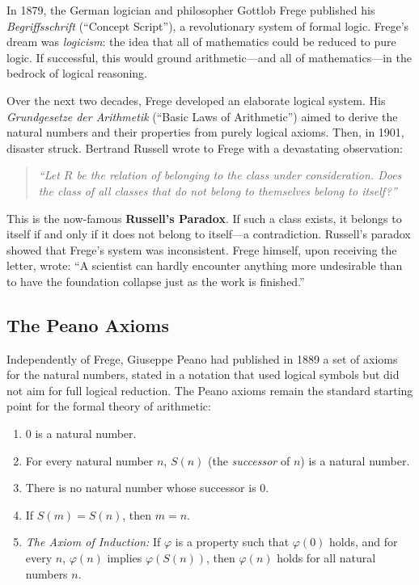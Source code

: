 In 1879, the German logician and philosopher Gottlob Frege published his \emph{Begriffsschrift} (``Concept Script''), a revolutionary system of formal logic. Frege's dream was \emph{logicism}: the idea that all of mathematics could be reduced to pure logic. If successful, this would ground arithmetic---and all of mathematics---in the bedrock of logical reasoning.

Over the next two decades, Frege developed an elaborate logical system. His \emph{Grundgesetze der Arithmetik} (``Basic Laws of Arithmetic'') aimed to derive the natural numbers and their properties from purely logical axioms. Then, in 1901, disaster struck. Bertrand Russell wrote to Frege with a devastating observation:

\begin{quote}
\textit{``Let $R$ be the relation of belonging to the class under consideration. Does the class of all classes that do not belong to themselves belong to itself?''}
\end{quote}

This is the now-famous \textbf{Russell's Paradox}. If such a class exists, it belongs to itself if and only if it does not belong to itself---a contradiction. Russell's paradox showed that Frege's system was inconsistent. Frege himself, upon receiving the letter, wrote: ``A scientist can hardly encounter anything more undesirable than to have the foundation collapse just as the work is finished.''

\subsection{The Peano Axioms}

Independently of Frege, Giuseppe Peano had published in 1889 a set of axioms for the natural numbers, stated in a notation that used logical symbols but did not aim for full logical reduction. The Peano axioms remain the standard starting point for the formal theory of arithmetic:

\begin{enumerate}[label=\textbf{P\arabic*}, leftmargin=2em]
    \item $0$ is a natural number.
    \item For every natural number $n$, $S(n)$ (the \emph{successor} of $n$) is a natural number.
    \item There is no natural number whose successor is $0$.
    \item If $S(m) = S(n)$, then $m = n$.
    \item \emph{The Axiom of Induction:} If $\varphi$ is a property such that $\varphi(0)$ holds, and for every $n$, $\varphi(n)$ implies $\varphi(S(n))$, then $\varphi(n)$ holds for all natural numbers $n$.
\end{enumerate}

